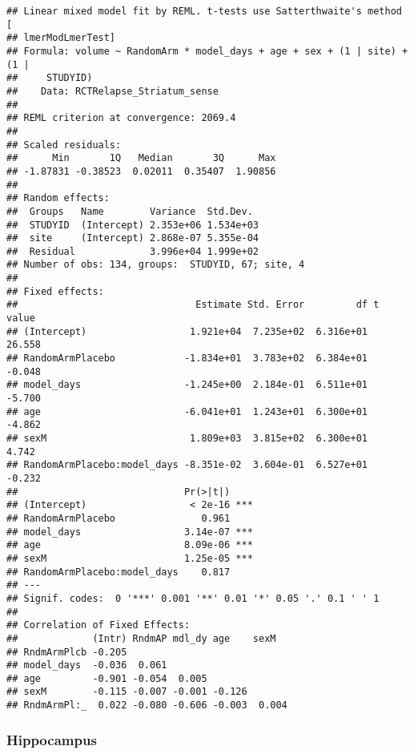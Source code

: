\documentclass[]{article}
\theoremstyle{definition}
\theoremstyle{definition}
\theoremstyle{definition}
\theoremstyle{remark}
\begin{document}
\begin{verbatim}
## Linear mixed model fit by REML. t-tests use Satterthwaite's method [
## lmerModLmerTest]
## Formula: volume ~ RandomArm * model_days + age + sex + (1 | site) + (1 |  
##     STUDYID)
##    Data: RCTRelapse_Striatum_sense
## 
## REML criterion at convergence: 2069.4
## 
## Scaled residuals: 
##      Min       1Q   Median       3Q      Max 
## -1.87831 -0.38523  0.02011  0.35407  1.90856 
## 
## Random effects:
##  Groups   Name        Variance  Std.Dev. 
##  STUDYID  (Intercept) 2.353e+06 1.534e+03
##  site     (Intercept) 2.868e-07 5.355e-04
##  Residual             3.996e+04 1.999e+02
## Number of obs: 134, groups:  STUDYID, 67; site, 4
## 
## Fixed effects:
##                               Estimate Std. Error         df t value
## (Intercept)                  1.921e+04  7.235e+02  6.316e+01  26.558
## RandomArmPlacebo            -1.834e+01  3.783e+02  6.384e+01  -0.048
## model_days                  -1.245e+00  2.184e-01  6.511e+01  -5.700
## age                         -6.041e+01  1.243e+01  6.300e+01  -4.862
## sexM                         1.809e+03  3.815e+02  6.300e+01   4.742
## RandomArmPlacebo:model_days -8.351e-02  3.604e-01  6.527e+01  -0.232
##                             Pr(>|t|)    
## (Intercept)                  < 2e-16 ***
## RandomArmPlacebo               0.961    
## model_days                  3.14e-07 ***
## age                         8.09e-06 ***
## sexM                        1.25e-05 ***
## RandomArmPlacebo:model_days    0.817    
## ---
## Signif. codes:  0 '***' 0.001 '**' 0.01 '*' 0.05 '.' 0.1 ' ' 1
## 
## Correlation of Fixed Effects:
##             (Intr) RndmAP mdl_dy age    sexM  
## RndmArmPlcb -0.205                            
## model_days  -0.036  0.061                     
## age         -0.901 -0.054  0.005              
## sexM        -0.115 -0.007 -0.001 -0.126       
## RndmArmPl:_  0.022 -0.080 -0.606 -0.003  0.004
\end{verbatim}

\subsubsection{Hippocampus}\label{hippocampus-1}
\end{document}
